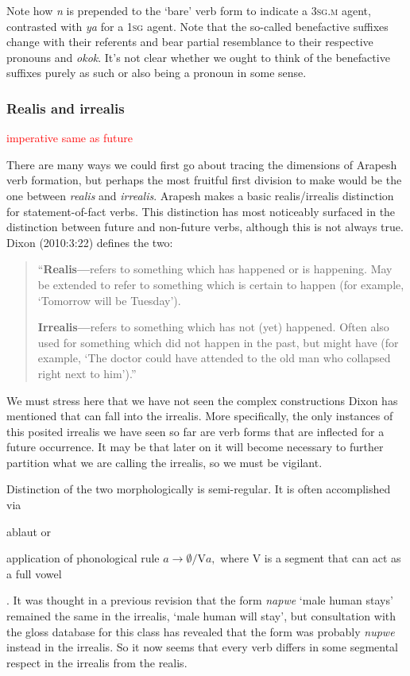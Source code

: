 \documentclass[pdftex,12pt,letterpaper]{article}
\let\ipa\textipa
\def\sw{\ipa{\super w}}
\newcommand\nyi[1]{\textcolor{red}{#1}}
\begin{document}
 \noindent Note how \emph{n\ipa{@}} is prepended to the `bare' verb form to indicate a \textsc{3sg.m} agent, contrasted with \emph{ya} for a \textsc{1sg} agent. Note that the so-called benefactive suffixes change with their referents and bear partial resemblance to their respective pronouns \emph{\ipa{@p@}} and \emph{ok\sw ok\sw}. It's not clear whether we ought to think of the benefactive suffixes purely as such or also being a pronoun in some sense.

 \subsubsection{Realis and irrealis}
 
 \nyi{imperative same as future}

 There are many ways we could first go about tracing the dimensions of Arapesh verb formation, but perhaps the most fruitful first division to make would be the one between \emph{realis} and \emph{irrealis}. Arapesh makes a basic realis/irrealis distinction for statement-of-fact verbs. This distinction has most noticeably surfaced in the distinction between future and non-future verbs, although this is not always true. Dixon (2010:3:22) defines the two: 
 
 \singlespacing\begin{quote}
 ``\textbf{Realis---}refers to something which has happened or is happening. May be extended to refer to something which is certain to happen (for example, `Tomorrow will be Tuesday').
 
 \textbf{Irrealis---}refers to something which has not (yet) happened. Often also used for something which did not happen in the past, but might have (for example, ‘The doctor could have attended to the old man who collapsed right next to him’).''
 \end{quote} \doublespacing
 
 \noindent We must stress here that we have not seen the complex constructions Dixon has mentioned that can fall into the irrealis. More specifically, the only instances of this posited irrealis we have seen so far are verb forms that are inflected for a future occurrence. It may be that later on it will become necessary to further partition what we are calling the irrealis, so we must be vigilant. 
 
 Distinction of the two morphologically is semi-regular. It is often accomplished via \begin{inparaenum}[(a)] \item ablaut or \item application of phonological rule $a \rightarrow \emptyset / \text{V}a,$ where V is a segment that can act as a full vowel\end{inparaenum}. It was thought in a previous revision that the form \emph{napwe} `male human stays' remained the same in the irrealis, `male human will stay', but consultation with the gloss database for this class has revealed that the form was probably \emph{nupwe} instead in the irrealis. So it now seems that every verb differs in some segmental respect in the irrealis from the realis.
\end{document}
